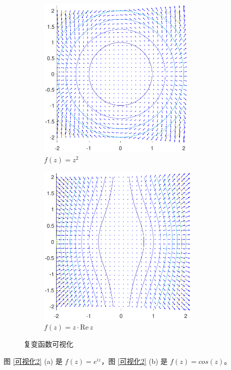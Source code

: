 \documentclass[UTF8]{report}
\def\Re{\mathrm{Re\,}}
\theoremstyle{MyLineTheoremStyle} %
\theoremstyle{MyBlockTheoremStyle} %
\theoremstyle{MySubsubsectionStyle} %
\begin{document}
\begin{figure}[H]\centering
\begin{subfigure}[t]{0.49\textwidth}\centering
    \includegraphics[height=220pt]{assets/1,2/z^2.pdf}
    \caption{ $f(z) = z^2$ }
\end{subfigure}\begin{subfigure}[t]{0.49\textwidth}\centering
    \includegraphics[height=220pt]{assets/1,2/zRez.pdf}
    \caption{ $f(z) = z\cdot \Re z$ }
\end{subfigure}
\caption{ 复变函数可视化 }\label{可视化1}
\end{figure}

图 \ref{可视化2} (a) 是 $f(z) = e^{iz}$，图 \ref{可视化2} (b) 是 $f(z) = cos(z)$。
\end{document}
